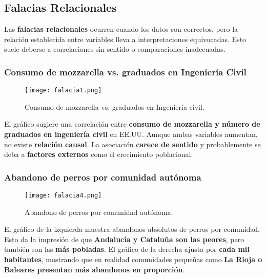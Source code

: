 \documentclass[12pt,a4paper]{article}
\begin{document}
\newpage

\subsection{Falacias Relacionales}
Las \textbf{falacias relacionales} ocurren cuando los datos son correctos, 
pero la relación establecida entre variables lleva a interpretaciones equivocadas. 
Esto suele deberse a correlaciones sin sentido o comparaciones inadecuadas.

\subsubsection{Consumo de mozzarella vs. graduados en Ingeniería Civil}
\begin{figure}[h]
    \centering
    \texttt{[image: falacia1.png]}
    \caption{Consumo de mozzarella vs. graduados en Ingeniería civil.}
    \label{fig:grafico1}
\end{figure}
El gráfico sugiere una correlación entre \textbf{consumo de mozzarella y número de graduados en ingeniería civil} en EE.UU. 
Aunque ambas variables aumentan, no existe \textbf{relación causal}. 
La asociación \textbf{carece de sentido} y probablemente se deba a \textbf{factores externos} como el crecimiento poblacional.

\subsubsection{Abandono de perros por comunidad autónoma}
\begin{figure}[h]
    \centering
    \texttt{[image: falacia4.png]}
    \caption{Abandono de perros por comunidad autónoma.}
    \label{fig:grafico4}
\end{figure}
El gráfico de la izquierda muestra abandonos absolutos de perros por comunidad. 
Esto da la impresión de que \textbf{Andalucía y Cataluña son las peores}, pero también son las \textbf{más pobladas}. 
El gráfico de la derecha ajusta por \textbf{cada mil habitantes}, mostrando que en realidad comunidades pequeñas como \textbf{La Rioja o Baleares presentan más abandonos en proporción}.
\end{document}
